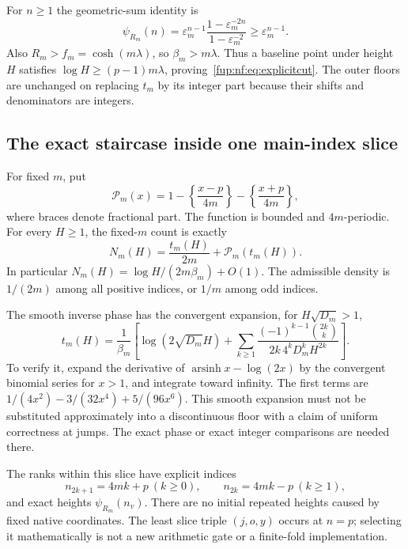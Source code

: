 \documentclass[11pt,letterpaper]{article}
\theoremstyle{definition}\newtheorem{definition}[theorem]{Definition}
\theoremstyle{remark}\newtheorem{remark}[theorem]{Remark}
\DeclareMathOperator{\arsinh}{arsinh}
\begin{document}
For $n\ge1$ the geometric-sum identity is
\begin{equation}\label{fup:nf:eq:geom}
 \psi_{R_m}(n)=\varepsilon_m^{n-1}
 \frac{1-\varepsilon_m^{-2n}}{1-\varepsilon_m^{-2}}\ge\varepsilon_m^{n-1}.
\end{equation}
Also $R_m>f_m=\cosh(m\lambda)$, so $\beta_m>m\lambda$. Thus a baseline point under height $H$ satisfies
$\log H\ge(p-1)m\lambda$, proving~\eqref{fup:nf:eq:explicitcut}.
The outer floors are unchanged on replacing $t_m$ by its integer part because their shifts and denominators are integers.

\subsection{The exact staircase inside one main-index slice}
For fixed $m$, put
\[
 \mathcal P_m(x)=1-\left\{\frac{x-p}{4m}\right\}
                  -\left\{\frac{x+p}{4m}\right\},
\]
where braces denote fractional part. The function is bounded and $4m$-periodic. For every $H\ge1$, the fixed-$m$ count is exactly
\begin{equation}\label{fup:nf:eq:phase}
 N_m(H)=\frac{t_m(H)}{2m}+\mathcal P_m(t_m(H)).
\end{equation}
In particular $N_m(H)=\log H/(2m\beta_m)+O(1)$. The admissible density is $1/(2m)$ among all positive indices, or $1/m$ among odd indices.

The smooth inverse phase has the convergent expansion, for $H\sqrt{D_m}>1$,
\begin{equation}\label{fup:nf:eq:phaseexpansion}
 t_m(H)=\frac{1}{\beta_m}\left[
 \log(2\sqrt{D_m}H)+\sum_{k\ge1}
 \frac{(-1)^{k-1}\binom{2k}{k}}{2k\,4^kD_m^kH^{2k}}
 \right].
\end{equation}
To verify it, expand the derivative of $\arsinh x-\log(2x)$ by the convergent binomial series for $x>1$, and integrate toward infinity. The first terms are $1/(4x^2)-3/(32x^4)+5/(96x^6)$. This smooth expansion must not be substituted approximately into a discontinuous floor with a claim of uniform correctness at jumps. The exact phase or exact integer comparisons are needed there.

The ranks within this slice have explicit indices
\[
 n_{2k+1}=4mk+p\ (k\ge0),\qquad
 n_{2k}=4mk-p\ (k\ge1),
\]
and exact heights $\psi_{R_m}(n_v)$. There are no initial repeated heights caused by fixed native coordinates. The least slice triple $(j,o,y)$ occurs at $n=p$; selecting it mathematically is not a new arithmetic gate or a finite-fold implementation.
\end{document}
